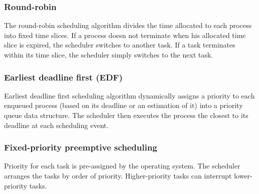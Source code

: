 \subsubsection{Round-robin}
The round-robin scheduling algorithm divides the time allocated to each process into fixed time slices.
If a process doesn not terminate when his allocated time slice is expired, the scheduler switches to another task.
If a task terminates within its time slice, the scheduler simply switches to the next task.

\subsubsection{Earliest deadline first (EDF)}
Earliest deadline first scheduling algorithm dynamically assigns a priority
    to each enqueued process (based on its deadline or an estimation of it) into a priority queue data structure.
The scheduler then executes the process the closest to its deadline at each scheduling event.

\subsubsection{Fixed-priority preemptive scheduling}
Priority for each task is pre-assigned by the operating system.
The scheduler arranges the tasks by order of priority.
Higher-priority tasks can interrupt lower-priority tasks\cite{Operatin47:online}.

